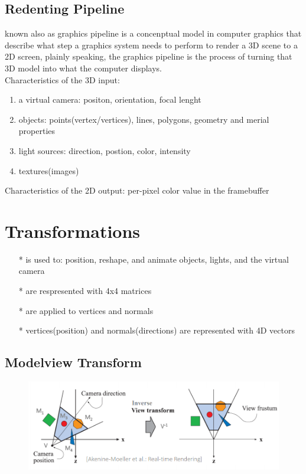 \documentclass[12pt, a4paper]{article}
\begin{document}
\subsection{Redenting Pipeline}
known also as graphics pipeline is a concenptual model in computer graphics that describe what step a graphics system needs to perform to render a 3D scene to a 2D screen, plainly speaking, the
graphics pipeline is the process of turning that 3D model into what the computer displays. \\
Characteristics of the 3D input:
\begin{enumerate}
  \item a virtual camera: positon, orientation, focal lenght
  \item objects: points(vertex/vertices), lines, polygons, geometry and merial properties
  \item light sources: direction, postion, color, intensity
  \item textures(images)
\end{enumerate}
Characteristics of the 2D output: per-pixel color value in the framebuffer

\section{Transformations}
\begin{itemize}
  \item[*]  is used to: position, reshape, and animate objects, lights, and the virtual camera
  \item[*]  are respresented with 4x4 matrices
  \item[*]  are applied to vertices and normals
  \item[*]  vertices(position) and normals(directions) are represented with 4D vectors
\end{itemize}

\subsection{Modelview Transform}
\begin{figure}[!ht]
  \centering
  \includegraphics[width=\textwidth]{image/viewTransform}
  \label{}
\end{figure}
\end{document}
